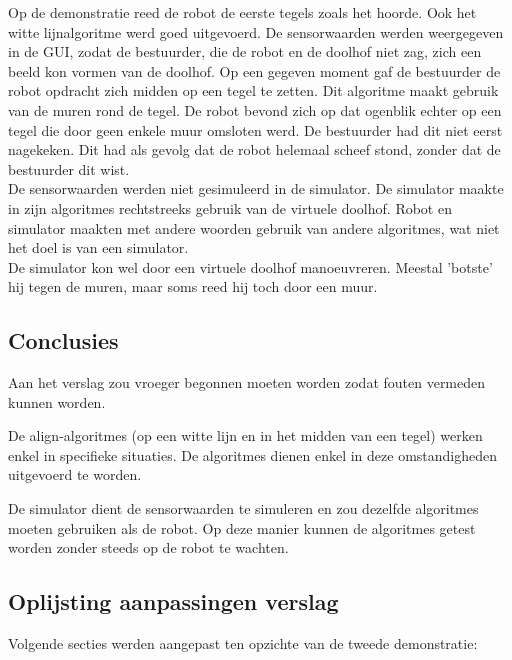 \documentclass[eind]{penoverslag}
\begin{document}
Op de demonstratie reed de robot de eerste tegels zoals het hoorde. Ook het witte lijnalgoritme werd goed uitgevoerd. De sensorwaarden werden weergegeven in de GUI, zodat de bestuurder, die de robot en de doolhof niet zag, zich een beeld kon vormen van de doolhof. Op een gegeven moment gaf de bestuurder de robot opdracht zich midden op een tegel te zetten. Dit algoritme maakt gebruik van de muren rond de tegel. De robot bevond zich op dat ogenblik echter op een tegel die door geen enkele muur omsloten werd. De bestuurder had dit niet eerst nagekeken. Dit had als gevolg dat de robot helemaal scheef stond, zonder dat de bestuurder dit wist.\\

De sensorwaarden werden niet gesimuleerd in de simulator. De simulator maakte in zijn algoritmes rechtstreeks gebruik van de virtuele doolhof. Robot en simulator maakten met andere woorden gebruik van andere algoritmes, wat niet het doel is van een simulator.\\

De simulator kon wel door een virtuele doolhof manoeuvreren. Meestal 'botste' hij tegen de muren, maar soms reed hij toch door een muur.


\subsection{Conclusies} %
\label{Assec:conc2}
Aan het verslag zou vroeger begonnen moeten worden zodat fouten vermeden kunnen worden.

De align-algoritmes (op een witte lijn en in het midden van een tegel) werken enkel in specifieke situaties. De algoritmes dienen enkel in deze omstandigheden uitgevoerd te worden.

De simulator dient de sensorwaarden te simuleren en zou dezelfde algoritmes moeten gebruiken als de robot. Op deze manier kunnen de algoritmes getest worden zonder steeds op de robot te wachten.


\subsection{Oplijsting aanpassingen verslag} %
\label{Assec:aanp2}
Volgende secties werden aangepast ten opzichte van de tweede demonstratie:
\end{document}
